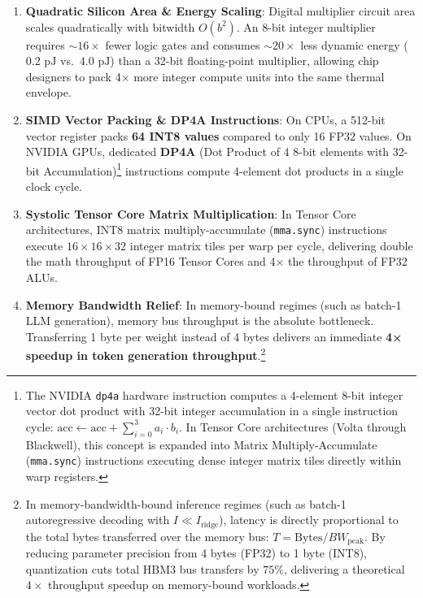 \documentclass[
  letterpaper,
]{scrbook}
\providecommand{\tightlist}{%
  \setlength{\itemsep}{0pt}\setlength{\parskip}{0pt}}
\begin{document}
\begin{enumerate}
\def\labelenumi{\arabic{enumi}.}
\tightlist
\item
  \textbf{Quadratic Silicon Area \& Energy Scaling}: Digital multiplier
  circuit area scales quadratically with bitwidth \(O(b^2)\). An 8-bit
  integer multiplier requires \(\sim 16\times\) fewer logic gates and
  consumes \(\sim 20\times\) less dynamic energy (\(0.2\text{ pJ}\)
  vs.~\(4.0\text{ pJ}\)) than a 32-bit floating-point multiplier,
  allowing chip designers to pack 4× more integer compute units into the
  same thermal envelope.
\item
  \textbf{SIMD Vector Packing \& DP4A Instructions}: On CPUs, a 512-bit
  vector register packs \textbf{64 INT8 values} compared to only 16 FP32
  values. On NVIDIA GPUs, dedicated \textbf{DP4A} (Dot Product of 4
  8-bit elements with 32-bit Accumulation)\footnote{The NVIDIA
    \texttt{dp4a} hardware instruction computes a 4-element 8-bit
    integer vector dot product with 32-bit integer accumulation in a
    single instruction cycle:
    \(\text{acc} \leftarrow \text{acc} + \sum_{i=0}^3 a_i \cdot b_i\).
    In Tensor Core architectures (Volta through Blackwell), this concept
    is expanded into Matrix Multiply-Accumulate (\texttt{mma.sync})
    instructions executing dense integer matrix tiles directly within
    warp registers.} instructions compute 4-element dot products in a
  single clock cycle.
\item
  \textbf{Systolic Tensor Core Matrix Multiplication}: In Tensor Core
  architectures, INT8 matrix multiply-accumulate (\texttt{mma.sync})
  instructions execute \(16 \times 16 \times 32\) integer matrix tiles
  per warp per cycle, delivering double the math throughput of FP16
  Tensor Cores and 4× the throughput of FP32 ALUs.
\item
  \textbf{Memory Bandwidth Relief}: In memory-bound regimes (such as
  batch-1 LLM generation), memory bus throughput is the absolute
  bottleneck. Transferring 1 byte per weight instead of 4 bytes delivers
  an immediate \textbf{4× speedup in token generation
  throughput}.\footnote{In memory-bandwidth-bound inference regimes
    (such as batch-1 autoregressive decoding with
    \(I \ll I_{\text{ridge}}\)), latency is directly proportional to the
    total bytes transferred over the memory bus:
    \(T = \text{Bytes} / BW_{\text{peak}}\). By reducing parameter
    precision from 4 bytes (FP32) to 1 byte (INT8), quantization cuts
    total HBM3 bus transfers by \(75\%\), delivering a theoretical
    \(4\times\) throughput speedup on memory-bound workloads.}
\end{enumerate}
\end{document}
